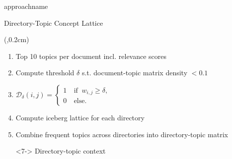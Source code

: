 \begin{frame}{\acs{approachname}}
    \begin{figure}
        
    \end{figure}
\end{frame}




%         

\begin{frame}{Directory-Topic Concept Lattice}
    \begin{textblock*}{3.7cm}(\paperwidth-3.8cm,0.2cm) %
        \only<1>{
            
        }
    \end{textblock*}
    \begin{enumerate}
        \item <1,3-> Top 10 topics per document incl. relevance scores
        \item <3-> Compute threshold $\delta$ s.t. document-topic matrix density $< 0.1$
        \item <4-> $\mathcal{D}_\delta(i,j)=\left\{ \begin{array}{cl}
                        1 & \ \text{if } \ w_{i,j} \geq \delta, \\
                        0 & \ \text{else.}
                    \end{array} \right.$
        \item <5-> Compute iceberg lattice for each directory
        \item <6-> Combine frequent topics across directories into directory-topic matrix
        \item[\rightarrowfill] <7-> Directory-topic context
    \end{enumerate}



\end{frame}
